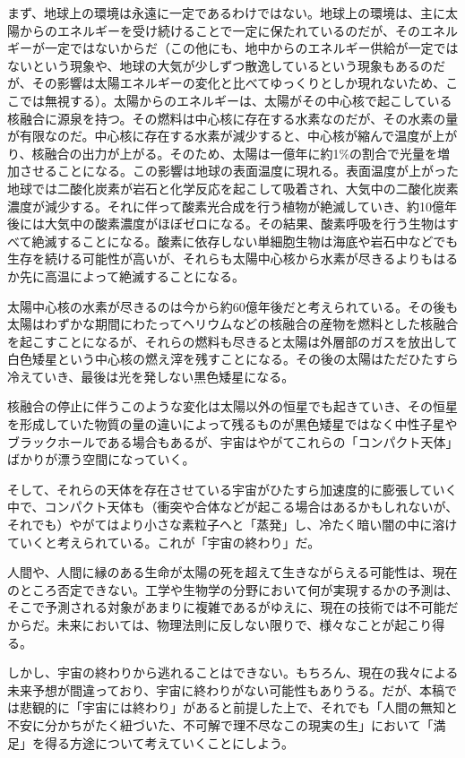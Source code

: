 \documentclass[
]{ltjsarticle}
\begin{document}
まず、地球上の環境は永遠に一定であるわけではない。地球上の環境は、主に太陽からのエネルギーを受け続けることで一定に保たれているのだが、そのエネルギーが一定ではないからだ（この他にも、地中からのエネルギー供給が一定ではないという現象や、地球の大気が少しずつ散逸しているという現象もあるのだが、その影響は太陽エネルギーの変化と比べてゆっくりとしか現れないため、ここでは無視する）。太陽からのエネルギーは、太陽がその中心核で起こしている核融合に源泉を持つ。その燃料は中心核に存在する水素なのだが、その水素の量が有限なのだ。中心核に存在する水素が減少すると、中心核が縮んで温度が上がり、核融合の出力が上がる。そのため、太陽は一億年に約1\%の割合で光量を増加させることになる。この影響は地球の表面温度に現れる。表面温度が上がった地球では二酸化炭素が岩石と化学反応を起こして吸着され、大気中の二酸化炭素濃度が減少する。それに伴って酸素光合成を行う植物が絶滅していき、約10億年後には大気中の酸素濃度がほぼゼロになる。その結果、酸素呼吸を行う生物はすべて絶滅することになる。酸素に依存しない単細胞生物は海底や岩石中などでも生存を続ける可能性が高いが、それらも太陽中心核から水素が尽きるよりもはるか先に高温によって絶滅することになる。

太陽中心核の水素が尽きるのは今から約60億年後だと考えられている。その後も太陽はわずかな期間にわたってヘリウムなどの核融合の産物を燃料とした核融合を起こすことになるが、それらの燃料も尽きると太陽は外層部のガスを放出して白色矮星という中心核の燃え滓を残すことになる。その後の太陽はただひたすら冷えていき、最後は光を発しない黒色矮星になる。

核融合の停止に伴うこのような変化は太陽以外の恒星でも起きていき、その恒星を形成していた物質の量の違いによって残るものが黒色矮星ではなく中性子星やブラックホールである場合もあるが、宇宙はやがてこれらの「コンパクト天体」ばかりが漂う空間になっていく。

そして、それらの天体を存在させている宇宙がひたすら加速度的に膨張していく中で、コンパクト天体も（衝突や合体などが起こる場合はあるかもしれないが、それでも）やがてはより小さな素粒子へと「蒸発」し、冷たく暗い闇の中に溶けていくと考えられている。これが「宇宙の終わり」だ。

人間や、人間に縁のある生命が太陽の死を超えて生きながらえる可能性は、現在のところ否定できない。工学や生物学の分野において何が実現するかの予測は、そこで予測される対象があまりに複雑であるがゆえに、現在の技術では不可能だからだ。未来においては、物理法則に反しない限りで、様々なことが起こり得る。

しかし、宇宙の終わりから逃れることはできない。もちろん、現在の我々による未来予想が間違っており、宇宙に終わりがない可能性もありうる。だが、本稿では悲観的に「宇宙には終わり」があると前提した上で、それでも「人間の無知と不安に分かちがたく紐づいた、不可解で理不尽なこの現実の生」において「満足」を得る方途について考えていくことにしよう。
\end{document}
